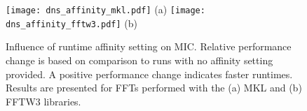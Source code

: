 \begin{figure}[htp]
\begin{center}
\texttt{[image: dns\_affinity\_mkl.pdf]}
(a)
\texttt{[image: dns\_affinity\_fftw3.pdf]}
(b)
\end{center}
\vspace*{-.5cm}
\caption{Influence of runtime affinity setting on MIC.
  Relative performance change is based
  on comparison to runs with no affinity setting provided. A
  positive performance change indicates faster runtimes.  Results are
  presented for FFTs performed with the (a) MKL and (b) FFTW3
  libraries.}
\label{fig:dns_affinity}
\end{figure}




%

%
